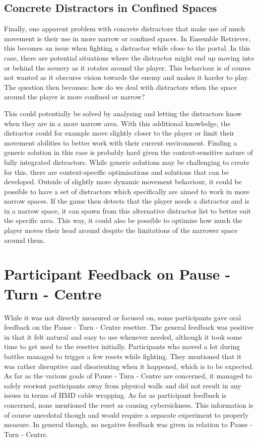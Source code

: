 \subsection{Concrete Distractors in Confined Spaces}
Finally, one apparent problem with concrete distractors that make use of much movement is their use in more narrow or confined spaces. In Ensemble Retriever, this becomes an issue when fighting a distractor while close to the portal. In this case, there are potential situations where the distractor might end up moving into or behind the scenery as it rotates around the player. This behaviour is of course not wanted as it obscures vision towards the enemy and makes it harder to play. The question then becomes: how do we deal with distractors when the space around the player is more confined or narrow?

This could potentially be solved by analysing and letting the distractors know when they are in a more narrow area. With this additional knowledge, the distractor could for example move slightly closer to the player or limit their movement abilities to better work with their current environment. Finding a generic solution in this case is probably hard given the context-sensitive nature of fully integrated distractors. While generic solutions may be challenging to create for this, there are context-specific optimisations and solutions that can be developed. Outside of slightly more dynamic movement behaviour, it could be possible to have a set of distractors which specifically are aimed to work in more narrow spaces. If the game then detects that the player needs a distractor and is in a narrow space, it can spawn from this alternative distractor list to better suit the specific area. This way, it could also be possible to optimise how much the player moves their head around despite the limitations of the narrower space around them. 
            
\section{Participant Feedback on Pause - Turn - Centre}
While it was not directly measured or focused on, some participants gave oral feedback on the Pause - Turn - Centre resetter. The general feedback was positive in that it felt natural and easy to use whenever needed, although it took some time to get used to the resetter initially. Participants who moved a lot during battles managed to trigger a few resets while fighting. They mentioned that it was rather disruptive and disorienting when it happened, which is to be expected. As far as the various goals of Pause - Turn - Centre are concerned, it managed to safely reorient participants away from physical walls and did not result in any issues in terms of HMD cable wrapping. As far as participant feedback is concerned, none mentioned the reset as causing cybersickness. This information is of course anecdotal though and would require a separate experiment to properly measure. In general though, no negative feedback was given in relation to Pause - Turn - Centre. 